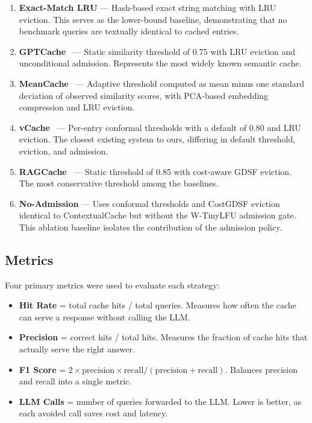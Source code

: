 \documentclass[conference]{IEEEtran}
\begin{document}
\begin{enumerate}[leftmargin=*]
\item \textbf{Exact-Match LRU} --- Hash-based exact string matching with LRU eviction. This serves as the lower-bound baseline, demonstrating that no benchmark queries are textually identical to cached entries.

\item \textbf{GPTCache}~\cite{regmi2024} --- Static similarity threshold of 0.75 with LRU eviction and unconditional admission. Represents the most widely known semantic cache.

\item \textbf{MeanCache}~\cite{gill2024} --- Adaptive threshold computed as mean minus one standard deviation of observed similarity scores, with PCA-based embedding compression and LRU eviction.

\item \textbf{vCache}~\cite{schroeder2025} --- Per-entry conformal thresholds with a default of 0.80 and LRU eviction. The closest existing system to ours, differing in default threshold, eviction, and admission.

\item \textbf{RAGCache}~\cite{jin2024} --- Static threshold of 0.85 with cost-aware GDSF eviction. The most conservative threshold among the baselines.

\item \textbf{No-Admission} --- Uses conformal thresholds and CostGDSF eviction identical to ContextualCache but without the W-TinyLFU admission gate. This ablation baseline isolates the contribution of the admission policy.
\end{enumerate}

\subsection{Metrics}

Four primary metrics were used to evaluate each strategy:
\begin{itemize}[leftmargin=*]
\item \textbf{Hit Rate} = total cache hits / total queries. Measures how often the cache can serve a response without calling the LLM.
\item \textbf{Precision} = correct hits / total hits. Measures the fraction of cache hits that actually serve the right answer.
\item \textbf{F1 Score} = $2 \times \text{precision} \times \text{recall} / (\text{precision} + \text{recall})$. Balances precision and recall into a single metric.
\item \textbf{LLM Calls} = number of queries forwarded to the LLM. Lower is better, as each avoided call saves cost and latency.
\end{itemize}
\end{document}
